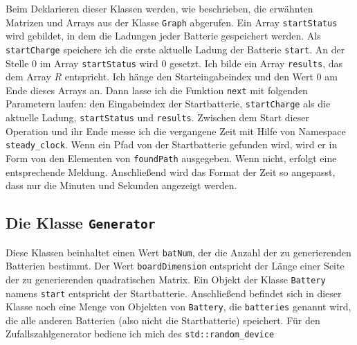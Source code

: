\documentclass[a4paper,10pt,ngerman]{scrartcl}
\begin{document}
Beim Deklarieren dieser Klassen werden, wie beschrieben, die erwähnten Matrizen und Arrays aus der Klasse \texttt{Graph}
abgerufen. Ein Array \texttt{startStatus} wird gebildet, in dem die Ladungen jeder Batterie gespeichert werden. 
Als \texttt{startCharge} speichere ich die erste aktuelle Ladung der Batterie \texttt{start}. An der Stelle 0 im Array
\texttt{startStatus} wird 0 gesetzt. Ich bilde ein Array \texttt{results}, das dem Array $R$ entspricht.
Ich hänge den Starteingabeindex und den Wert 0 am Ende dieses Arrays an. Dann lasse ich die Funktion \texttt{next} mit
folgenden Parametern laufen: den Eingabeindex der Startbatterie, \texttt{startCharge} als die aktuelle Ladung, \texttt{startStatus}
und \texttt{results}. Zwischen dem Start dieser Operation und ihr Ende messe ich die vergangene Zeit mit Hilfe von 
Namespace \texttt{steady\_clock}. Wenn ein Pfad von der Startbatterie gefunden wird, wird er in Form von den Elementen von
\texttt{foundPath} ausgegeben. Wenn nicht, erfolgt eine entsprechende Meldung. Anschließend wird das Format der Zeit so angepasst, 
dass nur die Minuten und Sekunden angezeigt werden.

\subsection{Die Klasse \texttt{Generator}}
Diese Klassen beinhaltet einen Wert \texttt{batNum}, der die Anzahl der zu generierenden Batterien bestimmt.
Der Wert \texttt{boardDimension} entspricht der Länge einer Seite der zu generierenden quadratischen Matrix.
Ein Objekt der Klasse \texttt{Battery} namens \texttt{start} entspricht der Startbatterie. Anschließend
befindet sich in dieser Klasse noch eine Menge von Objekten von \texttt{Battery}, die \texttt{batteries} genannt wird,
die alle anderen Batterien (also nicht die Startbatterie) speichert. Für den Zufallszahlgenerator bediene ich mich des
\texttt{std::random\_device}\\
\end{document}
